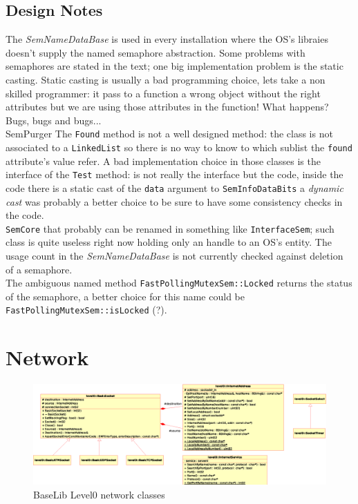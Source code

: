 \subsection{Design Notes}

The \textit{SemNameDataBase} is used in every installation where the OS's libraies doesn't supply the named semaphore abstraction.
Some problems with semaphores are stated in the text; one big implementation problem is the static casting. Static casting is usually a bad programming choice, lets take a non skilled programmer: it pass to a function a wrong object without the right attributes but we are using those attributes in the function! What happens? Bugs, bugs and bugs...\\


SemPurger
The \texttt{Found} method is not a well designed method: the class is not associated to a \texttt{LinkedList} so there is no way to know to which sublist the \texttt{found} attribute's value refer.
A bad implementation choice in those classes is the interface of the \texttt{Test} method: is not really the interface but the code, inside the code there is a static cast of the \texttt{data} argument to \texttt{SemInfoDataBits} a \textit{dynamic cast} was probably a better choice to be sure to have some consistency checks in the code. \\


\texttt{SemCore} that probably can be renamed in something like \texttt{InterfaceSem}; such class is quite useless right now holding only an handle to an OS's entity. The usage count in the \textit{SemNameDataBase} is not currently checked against deletion of a semaphore. \\


The ambiguous named method \texttt{FastPollingMutexSem::Locked} returns the status of the semaphore, a better choice for this name could be \texttt{FastPollingMutexSem::isLocked} (?).



\section{Network}
\begin{figure}[h!]
  \includegraphics[width=\textwidth]{level0/level0-network.eps}
 \caption{BaseLib Level0 network classes}
 \label{f:level0:network}
\end{figure}

